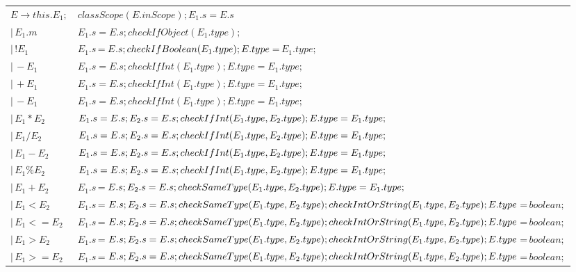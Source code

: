 \documentclass[11pt, oneside]{article}
\begin{document}
\begin{tabularx}{\textwidth}{ |X|X| }
\hline $E \rightarrow this.E_1; $ & $ classScope(E.inScope); E_1.s = E.s $ \\

	   $| \, E_1.m $ & $ E_1.s = E.s; checkIfObject(E_1.type); $ \\
	   
	   $| \, !E_1 $ & $ E_1.s\,$=$\,E.s; checkIfBoolean(E_1.type); \newline E.type\,$=$\,E_1.type; $ \\
	   
	   $| \, -E_1 $ & $ E_1.s = E.s; checkIfInt(E_1.type); E.type = E_1.type; $ \\
	   $| \, +E_1 $ & $ E_1.s = E.s; checkIfInt(E_1.type); E.type = E_1.type; $ \\
	   $| \, -E_1 $ & $ E_1.s = E.s; checkIfInt(E_1.type); E.type = E_1.type; $ \\
	   
	   $| \, E_1*E_2 $ & $ E_1.s = E.s; E_2.s = E.s; \newline checkIfInt(E_1.type, E_2.type); E.type = E_1.type; $ \\	   
	   $| \, E_1/E_2 $ & $ E_1.s = E.s; E_2.s = E.s; \newline checkIfInt(E_1.type, E_2.type); E.type = E_1.type; $ \\	
	   $| \, E_1-E_2 $ & $ E_1.s = E.s; E_2.s = E.s; \newline checkIfInt(E_1.type, E_2.type); E.type = E_1.type; $ \\
	   $| \, E_1\%E_2 $ & $ E_1.s = E.s; E_2.s = E.s; \newline checkIfInt(E_1.type, E_2.type); E.type = E_1.type; $ \\ 
	   
	   $| \, E_1+E_2 $ & $E_1.s \, $=$\, E.s; E_2.s = E.s; \, \newline checkSameType(E_1.type, E_2.type); E.type = E_1.type; $ \\	
	   $| \, E_1<E_2 $ & $E_1.s \, $=$\, E.s; E_2.s = E.s; \, \newline checkSameType(E_1.type, E_2.type); \newline checkIntOrString(E_1.type, E_2.type); E.type\,$=$\,boolean; $ \\
	   $| \, E_1<=E_2 $ & $E_1.s \, $=$\, E.s; E_2.s = E.s; \, \newline checkSameType(E_1.type, E_2.type); \newline checkIntOrString(E_1.type, E_2.type); E.type\,$=$\,boolean; $ \\
	   $| \, E_1>E_2 $ & $E_1.s \, $=$\, E.s; E_2.s = E.s; \, \newline checkSameType(E_1.type, E_2.type); \newline checkIntOrString(E_1.type, E_2.type); E.type\,$=$\,boolean; $ \\
	   $| \, E_1>=E_2 $ & $E_1.s \, $=$\, E.s; E_2.s = E.s; \, \newline checkSameType(E_1.type, E_2.type); \newline checkIntOrString(E_1.type, E_2.type); E.type\,$=$\,boolean; $ \\
	   	   

\end{tabularx}
\end{document}
